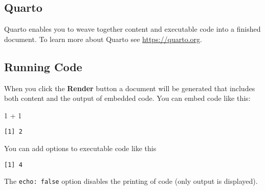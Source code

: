 \documentclass[
  letterpaper,
  DIV=11,
  numbers=noendperiod]{scrartcl}
\newenvironment{Shaded}{\begin{snugshade}}{\end{snugshade}}
\newcommand{\DecValTok}[1]{\textcolor[rgb]{0.68,0.00,0.00}{#1}}
\newcommand{\SpecialCharTok}[1]{\textcolor[rgb]{0.37,0.37,0.37}{#1}}
\begin{document}
\subsection{Quarto}\label{quarto}

Quarto enables you to weave together content and executable code into a
finished document. To learn more about Quarto see
\url{https://quarto.org}.

\subsection{Running Code}\label{running-code}

When you click the \textbf{Render} button a document will be generated
that includes both content and the output of embedded code. You can
embed code like this:

\begin{Shaded}
\begin{Highlighting}[]
\DecValTok{1} \SpecialCharTok{+} \DecValTok{1}
\end{Highlighting}
\end{Shaded}

\begin{verbatim}
[1] 2
\end{verbatim}

You can add options to executable code like this

\begin{verbatim}
[1] 4
\end{verbatim}

The \texttt{echo:\ false} option disables the printing of code (only
output is displayed).
\end{document}
